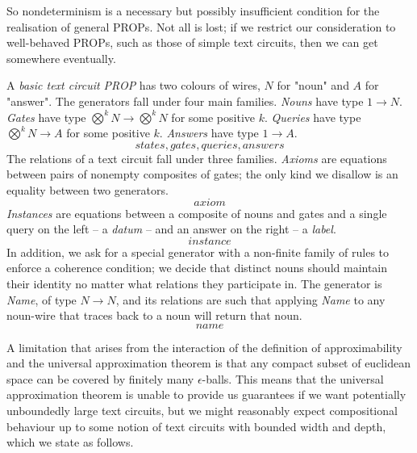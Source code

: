 \begin{fullwidth}
So nondeterminism is a necessary but possibly insufficient condition for the realisation of general PROPs. Not all is lost; if we restrict our consideration to well-behaved PROPs, such as those of simple text circuits, then we can get somewhere eventually.

\begin{defn}
A \emph{basic text circuit PROP} has two colours of wires, $N$ for "noun" and $A$ for "answer". The generators fall under four main families. \emph{Nouns} have type $1 \rightarrow N$. \emph{Gates} have type $\bigotimes^k N \rightarrow \bigotimes^k N$ for some positive $k$. \emph{Queries} have type $\bigotimes^k N \rightarrow A$ for some positive $k$. \emph{Answers} have type $1 \rightarrow A$.
\[states, gates, queries, answers\]
The relations of a text circuit fall under three families. \emph{Axioms} are equations between pairs of nonempty composites of gates; the only kind we disallow is an equality between two generators.
\[axiom\]
\emph{Instances} are equations between a composite of nouns and gates and a single query on the left -- a \emph{datum} -- and an answer on the right -- a \emph{label}.
\[instance\]
In addition, we ask for a special generator with a non-finite family of rules to enforce a coherence condition; we decide that distinct nouns should maintain their identity no matter what relations they participate in. The generator is \emph{Name}, of type $N \rightarrow N$, and its relations are such that applying \emph{Name} to any noun-wire that traces back to a noun will return that noun.
\[name\]
\end{defn}

\begin{example}

\end{example}

A limitation that arises from the interaction of the definition of approximability and the universal approximation theorem is that any compact subset of euclidean space can be covered by finitely many $\epsilon$-balls. This means that the universal approximation theorem is unable to provide us guarantees if we want potentially unboundedly large text circuits, but we might reasonably expect compositional behaviour up to some notion of text circuits with bounded width and depth, which we state as follows.


\end{fullwidth}

